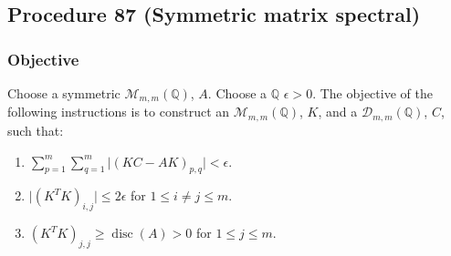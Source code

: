 \documentclass[twocolumn]{article}
\DeclareMathOperator{\disc}{disc}
\begin{document}
		\subsection{Procedure 87 (Symmetric matrix spectral)}\label{sec:procedure 87}
			\subsubsection{Objective}
				Choose a symmetric $\mathcal{M}_{m,m}(\mathbb{Q})$, $A$. Choose a $\mathbb{Q}$ $\epsilon>0$. The objective of the following instructions is to construct an $\mathcal{M}_{m,m}(\mathbb{Q})$, $K$, and a $\mathcal{D}_{m,m}(\mathbb{Q})$, $C$, such that:
				\begin{enumerate}
					\item $\sum_{p=1}^m\sum_{q=1}^m\lvert(KC-AK)_{p,q}\rvert<\epsilon$.
					\item $\lvert(K^TK)_{i,j}\rvert\le 2\epsilon$ for $1\le i\ne j\le m$.
					\item $(K^TK)_{j,j}\ge\disc(A)>0$ for $1\le j\le m$.
				\end{enumerate}
\end{document}
